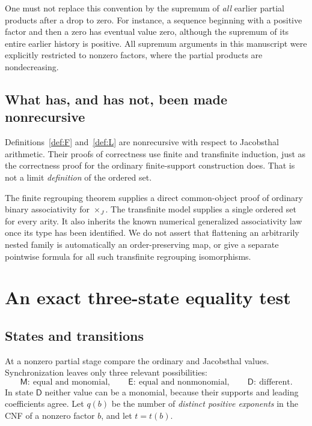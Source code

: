 \documentclass[11pt,letterpaper]{article}
\theoremstyle{definition}
\theoremstyle{remark}
\newcommand{\J}{\mathbin{\times_{\!J}}}
\begin{document}
One must not replace this convention by the supremum of \emph{all}
earlier partial products after a drop to zero. For instance, a sequence
beginning with a positive factor and then a zero has eventual value zero,
although the supremum of its entire earlier history is positive. All
supremum arguments in this manuscript were explicitly restricted to
nonzero factors, where the partial products are nondecreasing.

\subsection{What has, and has not, been made nonrecursive}

Definitions~\ref{def:F} and~\ref{def:L} are nonrecursive with respect to
Jacobsthal arithmetic. Their proofs of correctness use finite and
transfinite induction, just as the correctness proof for the ordinary
finite-support construction does. That is not a limit \emph{definition}
of the ordered set.

The finite regrouping theorem supplies a direct common-object proof of
ordinary binary associativity for $\J$. The transfinite model supplies a
single ordered set for every arity. It also inherits the known numerical
generalized associativity law once its type has been identified. We do
not assert that flattening an arbitrarily nested family is automatically
an order-preserving map, or give a separate pointwise formula for all
such transfinite regrouping isomorphisms.

\section{An exact three-state equality test}\label{sec:automaton}

\subsection{States and transitions}

At a nonzero partial stage compare the ordinary and Jacobsthal values.
Synchronization leaves only three relevant possibilities:
\[
 \mathsf M:\ \text{equal and monomial},\qquad
 \mathsf E:\ \text{equal and nonmonomial},\qquad
 \mathsf D:\ \text{different}.
\]
In state $\mathsf D$ neither value can be a monomial, because their
supports and leading coefficients agree. Let $q(b)$ be the number of
\emph{distinct positive exponents} in the CNF of a nonzero factor $b$,
and let $t=t(b)$.
\end{document}
